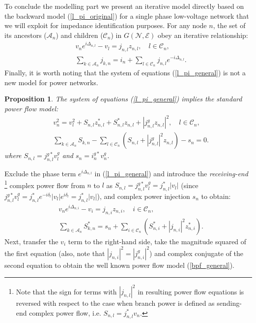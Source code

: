 \documentclass[journal,10pt,onecolumn,draftclsnofoot,]{IEEEtran}
\makeatletter
\theoremstyle{plain}
\newtheorem{proposition}{Proposition}
\theoremstyle{definition}
\theoremstyle{remark}
\renewenvironment{proof}[1][\proofname]{\par
  \pushQED{\qed}%
  \normalfont \topsep6\p@\@plus6\p@\relax
  \list{}{%
    \settowidth{\leftmargin}{\itshape\proofname:\hskip\labelsep}%
    \setlength{\labelwidth}{0pt}%
    \setlength{\itemindent}{-\leftmargin}%
  }%
  \item[\hskip\labelsep\itshape#1\@addpunct{:}]\ignorespaces
}{%
  \popQED\endlist\@endpefalse
}
\makeatother
\begin{document}
To conclude the modelling part we present an iterative model directly based on the backward model (\ref{l_pi_original}) for a single phase low-voltage network that we will exploit for impedance identification purposes. For any node $n$, the set of its ancestors ($\mathcal{A}_n$) and children ($\mathcal{C}_n$) in $G(\mathcal{N}, \mathcal{E})$ obey an iterative relationship:
\begin{equation}
\begin{split}
&{} v_{n}e^{i\Delta_{n, l}} - v_{l} = j_{n, l}z_{n, l}, \quad l \in \mathcal{C}_n,\\
& \sum_{k \in \mathcal{A}_n} j_{k, n} = i_{n} + \sum_{l \in \mathcal{C}_n} j_{n, l}e^{-i\Delta_{n, l}}.
\end{split}
\label{l_pi_general}
\end{equation}
Finally, it is worth noting that the system of equations (\ref{l_pi_general}) is not a new model for power networks. 
\begin{proposition}
  The system of equations (\ref{l_pi_general}) implies the standard power flow model:
  \begin{equation}
    \begin{split}
    &{} v_{n}^2 = v_{l}^2 + S_{n, l}z_{n, l}^* + S_{n, l}^*z_{n, l} + |j_{n, l}^gz_{n, l}|^2, \quad l \in \mathcal{C}_n, \\
    & \sum_{k \in \mathcal{A}_n} S_{k, n} - \sum_{l \in \mathcal{C}_n} (S_{n, l} + |j_{n, l}^g|^2z_{n, l})- s_{n} = 0.
    \end{split}
    \label{bpf_general}
  \end{equation}
  where $S_{n, l} = j_{n, l}^{g*}v_l^g$ and $s_{n} = i^{g*}_{n}v^{g}_{n}$.
\end{proposition}
\begin{proof}
  Exclude the phase term $e^{i\Delta_{n, l}}$ in (\ref{l_pi_general}) and introduce the \textit{receiving-end} \footnote{Note that the sign for terms with $|j_{n, l}|^2$ in resulting power flow equations is reversed with respect to the case when branch power is defined as sending-end complex power flow, i.e. $S_{n, l}=j_{n, l}^*v_n$.} complex power flow from $n$ to $l$ as $S_{n, l}=j_{n, l}^{g*}v_l^g = j_{n, l}^*|v_l|$ (since $ j_{n, l}^{g*}v_l^g = j_{n, l}^*e^{-i\delta_l}|v_l|e^{i\delta_l} = j_{n, l}^*|v_l|$), and  complex power injection $s_{n}$ to obtain:
  \begin{equation*}
    \begin{split}
    &{} v_{n}e^{i\Delta_{n, i}} - v_{i} = j_{n, i}z_{n, i}, \quad i \in \mathcal{C}_n,\\
    & \sum_{k \in \mathcal{A}_n} S_{k, n}^* = s_{n} + \sum_{i \in \mathcal{C}_n} (S_{n, i}^* + |j_{n, i}|^2z_{n, i}^*).
    \end{split}
  \end{equation*}
  Next, transfer the $v_i$ term to the right-hand side, take the magnitude squared of the first equation (also, note that $|j_{n, i}|^2 = |j_{n, i}^g|^2$) and complex conjugate of the second equation to obtain the well known power flow model (\ref{bpf_general}).
\end{proof} 
\end{document}
